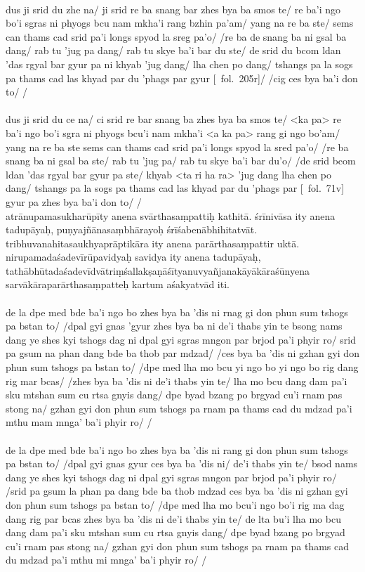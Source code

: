 \documentclass[12pt]{article}
\begin{document}
\textbf{\TVA}\\
dus ji srid du zhe na/ ji srid re ba snang bar zhes bya ba smos te/ re ba'i ngo bo'i sgras ni phyogs bcu nam mkha'i rang bzhin pa'am/ yang na re ba ste/ sems can thams cad srid pa'i longs spyod la sreg pa'o/ /re ba de snang ba ni gsal ba dang/ rab tu 'jug pa dang/ rab tu skye ba'i bar du ste/ de srid du bcom ldan 'das rgyal bar gyur pa ni khyab 'jug dang/ lha chen po dang/ tshangs pa la sogs pa thams cad las khyad par du 'phags par gyur [\TVA\ fol.\ 205r]/ /cig ces bya ba'i don to/ /\\

\textbf{\TVB}\\
dus ji srid du ce na/ ci srid re bar snang ba zhes bya ba smos te/ <ka pa> re ba'i ngo bo'i sgra ni phyogs bcu'i nam mkha'i <a ka pa> rang gi ngo bo'am/ yang na re ba ste sems can thams cad srid pa'i longs spyod la sred pa'o/ /re ba snang ba ni gsal ba ste/ rab tu 'jug pa/ rab tu skye ba'i bar du'o/ /de srid bcom ldan 'das rgyal bar gyur pa ste/ khyab <ta ri ha ra> 'jug dang lha chen po dang/ tshangs pa la sogs pa thams cad las khyad par du 'phags par [\TVB\ fol.\ 71v] gyur pa zhes bya ba'i don to/ /\\

atrānupamasukharūpīty anena svārthasaṃpattiḥ kathitā.
śrīnivāsa ity anena tadupāyaḥ, puṇyajñānasaṃbhārayoḥ śrīśabenābhihitatvāt.
tribhuvanahitasaukhyaprāptikāra ity anena parārthasaṃpattir uktā.
nirupamadaśadevīrūpavidyaḥ savidya ity anena tadupāyaḥ, tathābhūtadaśadevīdvātriṃśallakṣaṇāśītyanuvyañjanakāyākāraśūnyena sarvākāraparārthasaṃpatteḥ kartum aśakyatvād iti.\\

\textbf{\TVA}\\
de la dpe med bde ba'i ngo bo zhes bya ba 'dis ni rnag gi don phun sum tshogs pa bstan to/ /dpal gyi gnas 'gyur zhes bya ba ni de'i thabs yin te bsong nams dang ye shes kyi tshogs dag ni dpal gyi sgras mngon par brjod pa'i phyir ro/ srid pa gsum na phan dang bde ba thob par mdzad/ /ces bya ba 'dis ni gzhan gyi don phun sum tshogs pa bstan to/ /dpe med lha mo bcu yi ngo bo yi ngo bo rig dang rig mar bcas/ /zhes bya ba 'dis ni de'i thabs yin te/ lha mo bcu dang dam pa'i sku mtshan sum cu rtsa gnyis dang/ dpe byad bzang po brgyad cu'i rnam pas stong na/ gzhan gyi don phun sum tshogs pa rnam pa thams cad du mdzad pa'i mthu mam mnga' ba'i phyir ro/ /\\

\textbf{\TVB}\\
de la dpe med bde ba'i ngo bo zhes bya ba 'dis ni rang gi don phun sum tshogs pa bstan to/ /dpal gyi gnas gyur ces bya ba 'dis ni/ de'i thabs yin te/ bsod nams dang ye shes kyi tshogs dag ni dpal gyi sgras mngon par brjod pa'i phyir ro/ /srid pa gsum la phan pa dang bde ba thob mdzad ces bya ba 'dis ni gzhan gyi don phun sum tshogs pa bstan to/ /dpe med lha mo bcu'i ngo bo'i rig ma dag dang rig par bcas zhes bya ba 'dis ni de'i thabs yin te/ de lta bu'i lha mo bcu dang dam pa'i sku mtshan sum cu rtsa gnyis dang/ dpe byad bzang po brgyad cu'i rnam pas stong na/ gzhan gyi don phun sum tshogs pa rnam pa thams cad du mdzad pa'i mthu mi mnga' ba'i phyir ro/ /
\end{document}
